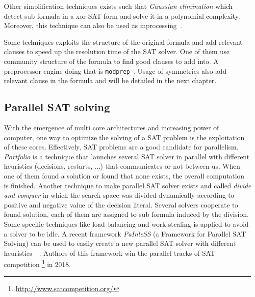 Other simplification techniques exists such that \emph{Gaussian elimination} which detect sub formula in a xor-SAT
form and solve it in a polynomial complexity. Moreover, this technique can also be used as inprocessing~\cite{soos2010enhanced}. 

Some techniques exploits the structure of the original formula and add relevant clauses to speed up the resolution
time of the SAT solver. One of them use community structure of the formula to find good clauses to add into.
A preprocessor engine doing that is  \texttt{modprep}~\cite{ansotegui2015using}.
Usage of symmetries also add relevant clause in the formula and will be detailed in the next chapter.


\subsection{Parallel SAT solving}
With the emergence of multi core architectures and increasing power of computer, one way to optimize the solving
of a SAT problem is the exploitation of these cores. Effectively, SAT problems are a good candidate for parallelism.
\emph{Portfolio} is a technique that launches several SAT solver in parallel with different heuristics (decisions, restarts, ...) that communicates or not between us. When one of them found a solution or found that none exists, the overall computation is finished. Another technique to make parallel SAT solver exists and called \emph{divide and conquer} in which the search space was divided dynamically according to positive and negative value of the decision
literal. Several solvers cooperate to found solution, each of them are assigned to sub formula induced by the division. Some specific techniques like load balancing and work stealing is applied to avoid a solver to be idle.
A recent framework \emph{PaInleSS} (a Framework for Parallel SAT Solving) can be used to easily create a new parallel 
SAT solver with different heuristics~\cite{le2017painless}~\cite{le2019modular}. Authors of this framework win the parallel tracks of SAT competition \footnote{\url{http://www.satcompetition.org/}} in 2018.







